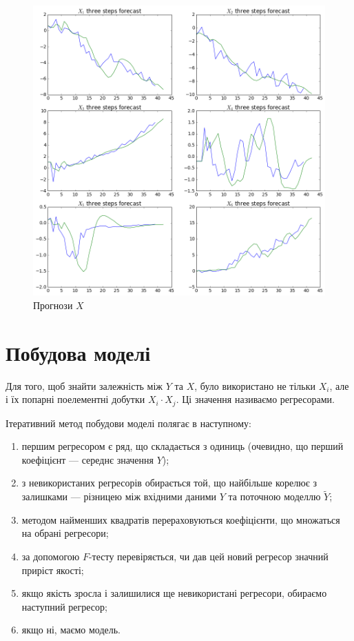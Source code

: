 \begin{figure}[h!]
  \centering
  \includegraphics[width=\textwidth]{Coursework2_files/Coursework2_14_0.png}
  \caption{Прогнози $X$}
\end{figure}

\section{Побудова моделі}

Для того, щоб знайти залежність між $Y$ та $X$,
було використано не тільки $X_i$,
але і їх попарні поелементні добутки $X_i \cdot X_j$.
Ці значення називаємо регресорами.

Ітеративний метод побудови моделі полягає в наступному:
\begin{enumerate}
  \item першим регресором є ряд, що складається з одиниць
    (очевидно, що перший коефіцієнт --- середнє значення $Y$);
  \item з невикористаних регресорів обирається той,
    що найбільше корелює з залишками ---
    різницею між вхідними даними $Y$ та поточною моделлю $\tilde{Y}$;
  \item методом найменших квадратів перераховуються коефіцієнти,
    що множаться на обрані регресори;
  \item за допомогою $F$-тесту перевіряється,
    чи дав цей новий регресор значний приріст якості;
  \item якщо якість зросла і залишилися ще невикористані регресори,
    обираємо наступний регресор;
  \item якщо ні, маємо модель.
\end{enumerate}

